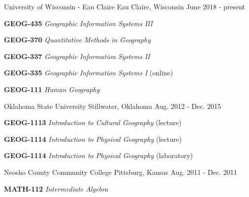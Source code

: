 

  \begin{cventries}
    \cventry
      {}
      {University of Wisconsin - Eau Claire}
      {Eau Claire, Wisconsin}
      {June 2018 - present}
      {
        \vspace{-3mm}
        \begin{expitems}
        \item {\textbf{GEOG-435} \textit{Geographic Information Systems III}}
        \item {\textbf{GEOG-370} \textit{Quantitative Methods in Geography}}
        \item {\textbf{GEOG-337} \textit{Geographic Information Systems II}}
        \item {\textbf{GEOG-335} \textit{Geographic Information Systems I} (online)}
        \item {\textbf{GEOG-111} \textit{Human Geography}}
        \end{expitems}
      }
  
    \cventry
      {}
      {Oklahoma State University}
      {Stillwater, Oklahoma}
      {Aug. 2012 - Dec. 2015}
      {
        \vspace{-3mm}
        \begin{expitems}
        \item {\textbf{GEOG-1113} \textit{Introduction to Cultural Geography}
            (lecture)}
        \item {\textbf{GEOG-1114} \textit{Introduction to Physical Geography} (lecture)}
        \item {\textbf{GEOG-1114} \textit{Introduction to Physical Geography} (laboratory)}
        \end{expitems}
      }
  
    \cventry
      {}
      {Neosho County Community College}
      {Pittsburg, Kansas}
      {Aug. 2011 - Dec. 2011}
      {
        \vspace{-3mm}
        \begin{expitems}
          \item {\textbf{MATH-112} \textit{Intermediate Algebra}}
        \end{expitems}
      }
  
  \end{cventries}

